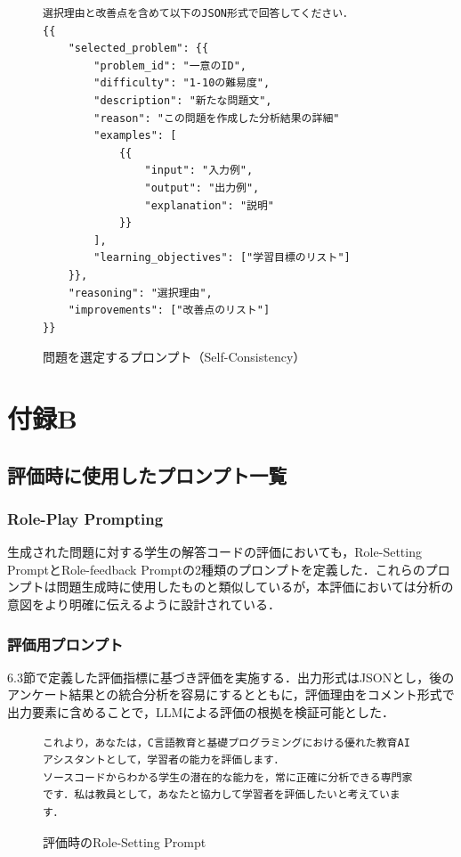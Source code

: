 \documentclass[11pt]{jreport}
\begin{document}
\begin{appendices}
\begin{figure}[!hbt]
\begin{mdframed}[linewidth=1pt]
\begin{lstlisting}
選択理由と改善点を含めて以下のJSON形式で回答してください．
{{
    "selected_problem": {{
        "problem_id": "一意のID",
        "difficulty": "1-10の難易度",
        "description": "新たな問題文",
        "reason": "この問題を作成した分析結果の詳細"
        "examples": [
            {{
                "input": "入力例",
                "output": "出力例",
                "explanation": "説明"
            }}
        ],
        "learning_objectives": ["学習目標のリスト"]
    }},
    "reasoning": "選択理由",
    "improvements": ["改善点のリスト"]
}}
\end{lstlisting}
\end{mdframed}
\caption{問題を選定するプロンプト（Self-Consistency）}
    \label{fig:self-consistency}
\end{figure}

\chapter*{付録B}  %
\setcounter{figure}{0}
\section{評価時に使用したプロンプト一覧}
\subsection{Role-Play Prompting}
生成された問題に対する学生の解答コードの評価においても，Role-Setting PromptとRole-feedback Promptの2種類のプロンプトを定義した．これらのプロンプトは問題生成時に使用したものと類似しているが，本評価においては分析の意図をより明確に伝えるように設計されている．
\subsection{評価用プロンプト}
6.3節で定義した評価指標に基づき評価を実施する．出力形式はJSONとし，後のアンケート結果との統合分析を容易にするとともに，評価理由をコメント形式で出力要素に含めることで，LLMによる評価の根拠を検証可能とした．
\begin{figure}[!hbt]
\begin{mdframed}[linewidth=1pt]
\begin{lstlisting}
これより，あなたは，C言語教育と基礎プログラミングにおける優れた教育AIアシスタントとして，学習者の能力を評価します．
ソースコードからわかる学生の潜在的な能力を，常に正確に分析できる専門家です．私は教員として，あなたと協力して学習者を評価したいと考えています．
\end{lstlisting}
\end{mdframed}
\caption{評価時のRole-Setting Prompt}
    \label{fig:role-setting-prompt-analyze}
\end{figure}


\end{appendices}
\end{document}
